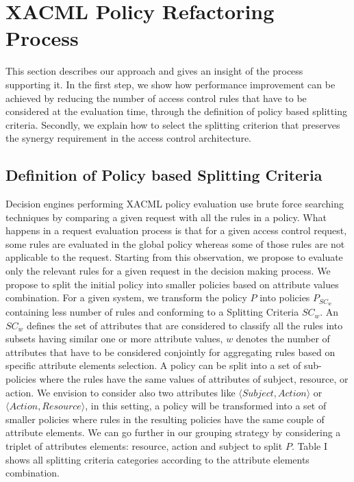 \section{XACML Policy Refactoring Process} \label{sec:approach}
This section describes our approach and gives an insight of the process supporting it. In the first step, we show how performance improvement can be achieved by
reducing the number of access control rules that have to be considered at the evaluation time, through the definition of policy based splitting criteria. 
Secondly, we explain how to select the splitting criterion that preserves the synergy requirement in the access control architecture.
\subsection{Definition of Policy based Splitting Criteria}
Decision engines performing XACML policy evaluation use brute force searching techniques by comparing a given request with all the rules in a policy.
What happens in a request evaluation process is that for a given access control request, some rules are evaluated in the global policy whereas some of those rules are not
 applicable to the request. Starting from this observation, we propose to evaluate only the relevant rules for a given request in the decision making process. 
We propose to split the initial policy into smaller policies based on attribute values combination. For a given system, we transform the policy \normalsize $P$ into 
policies \normalsize $P_{SC_{w}}$ containing less number of rules and conforming to a Splitting Criteria $SC_{w}$. An $SC_{w}$ defines the set of attributes that are considered 
to classify all the rules into subsets having similar one or more attribute values, $w$ denotes the number of attributes that have to be considered conjointly for aggregating 
rules based on specific attribute elements selection. A policy can be split into a set of sub-policies where the rules have the same values of attributes of subject, resource, or 
action. We envision to consider also two attributes like $\langle Subject, Action\rangle$ or $\langle Action, Resource\rangle$, in this setting, a policy will be transformed into a set of smaller 
policies where rules in the resulting policies have the same couple of attribute elements. We can go further in our grouping strategy by considering a triplet of attributes
elements: resource, action and subject to split \normalsize $P$. Table I shows all splitting criteria categories according to the attribute elements combination.
